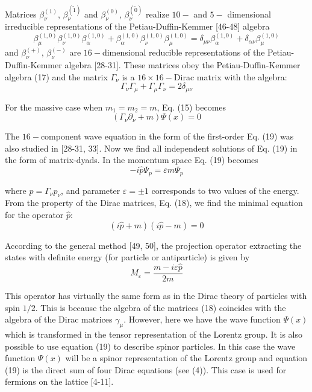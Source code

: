 \documentclass[a4paper,12pt]{article}
\begin{document}
Matrices $\beta _\nu ^{(1)}$, $\beta _\nu ^{(\widetilde{1})}$ and
$\beta _\nu ^{(0)}$, $\beta _\nu ^{(\widetilde{0})}$ realize $10-$
and $5-$ dimensional irreducible representations of the
Petiau-Duffin-Kemmer [46-48] algebra
\begin{equation}
\beta _\mu ^{(1,0)}\beta _\nu ^{(1,0)}\beta _\alpha ^{(1,0)}+\beta _\alpha
^{(1,0)}\beta _\nu ^{(1,0)}\beta _\mu ^{(1,0)}=\delta _{\mu \nu }\beta
_\alpha ^{(1,0)}+\delta _{\alpha \nu }\beta _\mu ^{(1,0)}  \label{17}
\end{equation}
and $\beta _\nu ^{(+)}$, $\beta _\nu ^{(-)}$ are $16-$dimensional reducible
representations of the Petiau-Duffin-Kemmer algebra [28-31]. These matrices
obey the Petiau-Duffin-Kemmer algebra (17) and the matrix $\Gamma _\nu $ is
a $16\times 16-$Dirac matrix with the algebra:
\begin{equation}
\Gamma _\nu \Gamma _\mu +\Gamma _\mu \Gamma _\nu =2\delta _{\mu
\nu } \label{18}
\end{equation}

For the massive case when $m_1=m_2=m$, Eq. (15) becomes
\begin{equation}
\left( \Gamma _\nu \partial _\nu +m\right) \Psi (x)=0  \label{19}
\end{equation}

The $16-$component wave equation in the form of the first-order Eq. (19) was
also studied in [28-31, 33]. Now we find all independent solutions of Eq.
(19) in the form of matrix-dyads. In the momentum space Eq. (19) becomes
\begin{equation}
-i\widehat{p}\Psi _p=\varepsilon m\Psi _p  \label{20}
\end{equation}

where $\widehat{p}=\Gamma _\nu p_\nu $, and parameter $\varepsilon
=\pm 1$ corresponds to two values of the energy. From the property
of the Dirac matrices, Eq. (18), we find the minimal equation for
the operator $\widehat{p }$:
\begin{equation}
\left( i\widehat{p}+m\right) \left( i\widehat{p}-m\right) =0  \label{21}
\end{equation}

According to the general method [49, 50], the projection operator extracting
the states with definite energy (for particle or antiparticle) is given by
\begin{equation}
M_\varepsilon =\frac{m-i\varepsilon \widehat{p}}{2m}  \label{22}
\end{equation}

This operator has virtually the same form as in the Dirac theory of
particles with spin $1/2$. This is because the algebra of the matrices (18)
coincides with the algebra of the Dirac matrices $\gamma _\mu .$ However,
here we have the wave function $\Psi (x)$ which is transformed in the tensor
representation of the Lorentz group. It is also possible to use equation
(19) to describe spinor particles. In this case the wave function $\Psi (x)$
will be a spinor representation of the Lorentz group and equation (19) is
the direct sum of four Dirac equations (see (4)). This case is used for
fermions on the lattice [4-11].
\end{document}
